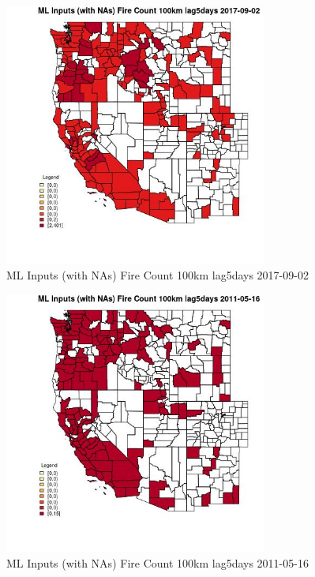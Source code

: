 \begin{figure} 
\centering  
\includegraphics[width=0.77\textwidth]{Code_Outputs/Report_ML_input_PM25_Step4_part_e_de_duplicated_aves_compiled_2019-05-21wNAs_CountyFire_Count_100km_lag5daysMean2017-09-02.jpg} 
\caption{\label{fig:Report_ML_input_PM25_Step4_part_e_de_duplicated_aves_compiled_2019-05-21wNAsCountyFire_Count_100km_lag5daysMean2017-09-02}ML Inputs (with NAs) Fire Count 100km lag5days 2017-09-02} 
\end{figure} 
 

\begin{figure} 
\centering  
\includegraphics[width=0.77\textwidth]{Code_Outputs/Report_ML_input_PM25_Step4_part_e_de_duplicated_aves_compiled_2019-05-21wNAs_CountyFire_Count_100km_lag5daysMean2011-05-16.jpg} 
\caption{\label{fig:Report_ML_input_PM25_Step4_part_e_de_duplicated_aves_compiled_2019-05-21wNAsCountyFire_Count_100km_lag5daysMean2011-05-16}ML Inputs (with NAs) Fire Count 100km lag5days 2011-05-16} 
\end{figure} 
 

